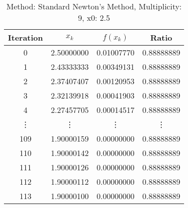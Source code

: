 \begin{table}
\centering
\caption{Method: Standard Newton's Method, Multiplicity: 9, x0: 2.5}
\label{tab:table_Standard_Newton's_Method_9_2_5}
\begin{tabular}{c c c c}
\toprule
Iteration &      $x_k$ &   $f(x_k)$ &      Ratio \\
\midrule
        0 & 2.50000000 & 0.01007770 & 0.88888889 \\
        1 & 2.43333333 & 0.00349131 & 0.88888889 \\
        2 & 2.37407407 & 0.00120953 & 0.88888889 \\
        3 & 2.32139918 & 0.00041903 & 0.88888889 \\
        4 & 2.27457705 & 0.00014517 & 0.88888889 \\
   \vdots &     \vdots &     \vdots &     \vdots \\
      109 & 1.90000159 & 0.00000000 & 0.88888889 \\
      110 & 1.90000142 & 0.00000000 & 0.88888889 \\
      111 & 1.90000126 & 0.00000000 & 0.88888889 \\
      112 & 1.90000112 & 0.00000000 & 0.88888889 \\
      113 & 1.90000100 & 0.00000000 & 0.88888889 \\
\bottomrule
\end{tabular}
\end{table}
